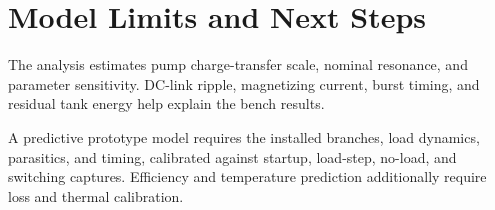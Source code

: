 \section{Model Limits and Next Steps}
\label{sec:sim-limitations}

The analysis estimates pump charge-transfer scale, nominal resonance, and parameter sensitivity. DC-link ripple, magnetizing current, burst timing, and residual tank energy help explain the bench results.

A predictive prototype model requires the installed branches, load dynamics, parasitics, and timing, calibrated against startup, load-step, no-load, and switching captures. Efficiency and temperature prediction additionally require loss and thermal calibration.


